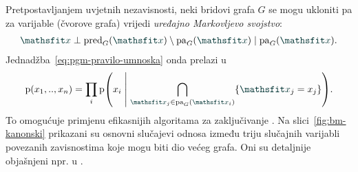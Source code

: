 \documentclass[utf8, diplomski, lmodern]{fer}
\begin{document}
Pretpostavljanjem uvjetnih nezavisnosti, neki bridovi grafa $G$ se mogu ukloniti pa za varijable (čvorove grafa) vrijedi \emph{uređajno Markovljevo svojstvo}:
\begin{align}
\rvar x\perp \pred_G(\rvar x) \setminus \pa_G(\rvar x) \mid \pa_G(\rvar x).
\end{align}
Jednadžba~\eqref{eq:pgm-pravilo-umnoska} onda prelazi u 
\begin{align}
\p(x_1,..,x_n) 
= \prod_i\p\del{x_i \midmid \bigcap_{\rvar x_j\in\pa_G(\rvar x_i)}\cbr{\rvar x_j=x_j}} \text{.}
\end{align} 
To omogućuje primjenu efikasnijih algoritama za zaključivanje \citep{Murphy:2012:MLPP}.
Na slici~\ref{fig:bm-kanonski} prikazani su osnovni slučajevi odnosa između triju slučajnih varijabli povezanih zavisnostima koje mogu biti dio većeg grafa. Oni su detaljnije objašnjeni npr. u \citet{Bishop:2006:PRML,Alpaydin:2014:IML}. 
\end{document}
